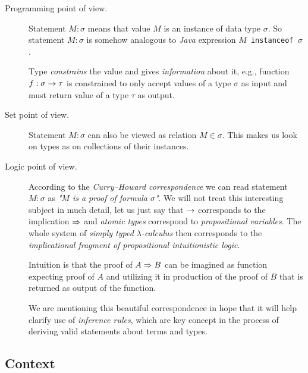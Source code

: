 \documentclass[12pt,a4paper]{report}
\newcommand{\lets}{let us\xspace}
\begin{document}
\begin{description}
  \item[Programming point of view.] 
   Statement $M : \sigma$ means that value $M$ is 
   an instance of data type
   $\sigma$. So statement $M : \sigma$ is
   somehow analogous to \textit{Java}
   expression \texttt{$M$ instanceof $\sigma$}.    
   
   Type \textit{constrains} the value 
   and gives \textit{information} about it, 
   e.g., function $f : \sigma \rightarrow \tau$ 
   is constrained to only accept values of a type $\sigma$
   as input and must return value of a type $\tau$ as output.
     
  \item[Set point of view.] 
     Statement $M : \sigma$ can also be viewed as relation
     $M \in \sigma$. This makes us look on types as on
     collections of their instances.
      
  \item[Logic point of view.] According to 
  the \textit{Curry–Howard correspondence}
  we can read statement $M : \sigma$ as 
  \textit{"$M$ is a proof of formula $\sigma$"}.
  We will not treat this interesting subject in much detail,
  \lets just say that $\rightarrow$ corresponds to the
  implication $\Rightarrow$ and \textit{atomic types} correspond to
  \textit{propositional variables}. The whole system of
  \textit{simply typed $\lambda$-calculus} then corresponds
  to the \textit{implicational fragment of propositional 
  intuitionistic logic}.
   
  Intuition is that the proof of $A \Rightarrow B$ 
  can be imagined as function expecting proof of $A$
  and utilizing it in production of the proof of $B$
  that is returned as output of the function. 
    
  We are mentioning this beautiful
  correspondence in hope that it will help clarify 
  use of \textit{inference rules}, which are key concept
  in the process of deriving valid statements about
  terms and types.  
      
\end{description}  	
	


	
\subsection{Context}

\end{document}
